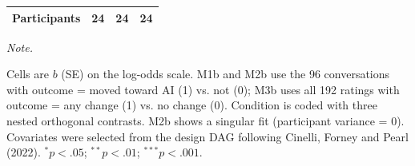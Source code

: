 \begin{table}[!h]
\begin{threeparttable}
\begin{tabular}[t]{lccc}
\hspace{1em}Participants & 24 & 24 & 24\\
\bottomrule
\end{tabular}
\begin{tablenotes}
\item \textit{Note.} 
\item Cells are $b$ (SE) on the log-odds scale. M1b and M2b use the 96 conversations with outcome = moved toward AI (1) vs. not (0); M3b uses all 192 ratings with outcome = any change (1) vs. no change (0). Condition is coded with three nested orthogonal contrasts. M2b shows a singular fit (participant variance = 0). Covariates were selected from the design DAG following Cinelli, Forney and Pearl (2022). $^{*}p<.05$; $^{**}p<.01$; $^{***}p<.001$.
\end{tablenotes}
\end{threeparttable}
\end{table}
